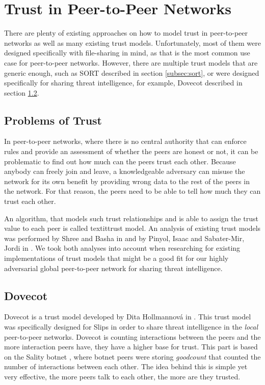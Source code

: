 \section{Trust in Peer-to-Peer Networks}
\label{sec:trust-in-p2p}

There are plenty of existing approaches on how to model trust in peer-to-peer networks as well as many existing trust models.
Unfortunately, most of them were designed specifically with file-sharing in mind, as that is the most common use case for peer-to-peer networks.
However, there are multiple trust models that are generic enough, such as SORT described in section \ref{subsec:sort}, or were designed specifically for sharing threat intelligence, for example, Dovecot described in section \ref{subsec:dovecot}.

\subsection{Problems of Trust}
\label{subsec:problems-of-trust}
In peer-to-peer networks, where there is no central authority that can enforce rules and provide an assessment of whether the peers are honest or not, it can be problematic to find out how much can the peers trust each other.
Because anybody can freely join and leave, a knowledgeable adversary can misuse the network for its own benefit by providing wrong data to the rest of the peers in the network.
For that reason, the peers need to be able to tell how much they can trust each other. 

An algorithm, that models such trust relationships and is able to assign the trust value to each peer is called \a textit{trust model}.
An analysis of existing trust models was performed by Shree and Basha in \cite{shree2014exhaustive} and by Pinyol, Isaac and Sabater-Mir, Jordi in \cite{pinyol2013computational}. 
We took both analyses into account when researching for existing implementations of trust models that might be a good fit for our highly adversarial global peer-to-peer network for sharing threat intelligence.

\subsection{Dovecot}
\label{subsec:dovecot}
Dovecot is a trust model developed by Dita Hollmannová in \cite{dita}.
This trust model was specifically designed for Slips in order to share threat intelligence in the \textit{local} peer-to-peer networks.
Dovecot is counting interactions between the peers and the more interaction peers have, they have a higher base for trust.
This part is based on the Sality botnet \cite{falliere2011sality}, where botnet peers were storing \textit{goodcount} that counted the number of interactions between each other.
The idea behind this is simple yet very effective, the more peers talk to each other, the more are they trusted.

